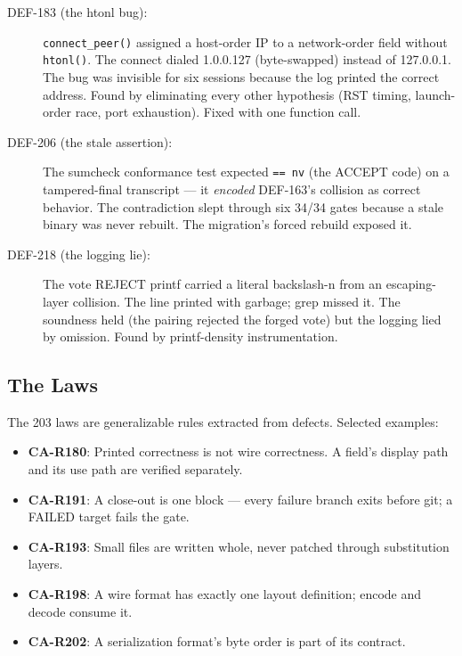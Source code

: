 \documentclass[11pt, a4paper]{article}
\begin{document}
\begin{description}
\item[DEF-183 (the htonl bug):] \texttt{connect\_peer()} assigned a host-order IP to a network-order field without \texttt{htonl()}. The connect dialed 1.0.0.127 (byte-swapped) instead of 127.0.0.1. The bug was invisible for six sessions because the log printed the correct address. Found by eliminating every other hypothesis (RST timing, launch-order race, port exhaustion). Fixed with one function call.

\item[DEF-206 (the stale assertion):] The sumcheck conformance test expected \texttt{== nv} (the ACCEPT code) on a tampered-final transcript --- it \emph{encoded} DEF-163's collision as correct behavior. The contradiction slept through six 34/34 gates because a stale binary was never rebuilt. The migration's forced rebuild exposed it.

\item[DEF-218 (the logging lie):] The vote REJECT printf carried a literal backslash-n from an escaping-layer collision. The line printed with garbage; grep missed it. The soundness held (the pairing rejected the forged vote) but the logging lied by omission. Found by printf-density instrumentation.
\end{description}

\subsection{The Laws}

The 203 laws are generalizable rules extracted from defects. Selected examples:

\begin{itemize}
\item \textbf{CA-R180}: Printed correctness is not wire correctness. A field's display path and its use path are verified separately.
\item \textbf{CA-R191}: A close-out is one block --- every failure branch exits before git; a FAILED target fails the gate.
\item \textbf{CA-R193}: Small files are written whole, never patched through substitution layers.
\item \textbf{CA-R198}: A wire format has exactly one layout definition; encode and decode consume it.
\item \textbf{CA-R202}: A serialization format's byte order is part of its contract.
\end{itemize}
\end{document}
